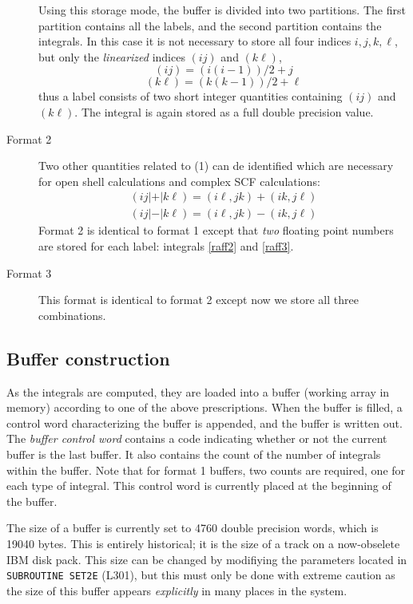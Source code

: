 \begin{description}
Using this storage mode, the buffer is divided into two partitions.
The first partition contains all the labels, and the second partition
contains the integrals. In this case it is not necessary to store all four
indices $i , j , k , \ell $, but only the {\em linearized} 
indices $(ij)$ and $(k \ell )$,
\[
(ij) = (i(i-1))/2 + j
\]
\[
(k \ell ) = (k(k-1))/2 + \ell
\]
thus a label consists of two short integer quantities containing $(ij)$ and
$(k \ell )$. The integral is again stored as a full double precision value.
\item[Format 2] Two other quantities related to (1) can de identified which
are necessary for open shell calculations and complex SCF calculations:
\begin{eqnarray}
(i j | + | k \ell ) = (i \ell , j k )  + (i k , j \ell ) \\
\label{raff2}
( i j | - | k \ell ) = ( i \ell , j k )  - ( i k , j \ell )
\label{raff3}
\end{eqnarray}
Format 2 is identical to format 1 except that {\em two} floating point
numbers are stored for each label: integrals \ref{raff2} and \ref{raff3}.
\item[Format 3] This format is identical to format 2 except now we store
all three combinations.
\end{description} 
\subsection{\sf Buffer construction}
As the integrals are computed, they are loaded into a buffer
(working array in memory) according to one of the above prescriptions.
When the buffer is filled, a control word characterizing the buffer is
appended, and the buffer is written out. The {\em buffer control word}
contains a code indicating whether or not the current buffer is the
last buffer. It also contains the count of the number of integrals
within the buffer. Note that for format 1 buffers, two counts are
required, one for each type of integral. This control word is
currently placed at the beginning of the buffer.

The size of a buffer is currently set to 4760 double precision
words, which is 19040 bytes. This is entirely historical; 
it is the size of a track on a now-obselete IBM
disk pack. This size can be changed by modifiying the parameters located
in {\tt SUBROUTINE SET2E} (L301), but this must only be done with
extreme caution as the size of this buffer appears {\em explicitly}
in many places in the system.

